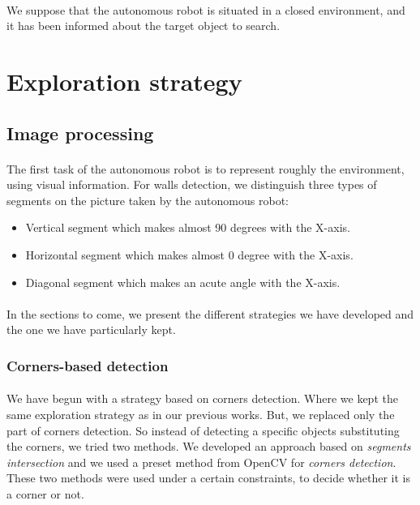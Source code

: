 \documentclass[12pt]{report}
\begin{document}
    \paragraph{}
    We suppose that the autonomous robot is situated in a closed environment, and it has been informed about the target object to search. 
	\section{Exploration strategy}
	 \subsection{Image processing}
	 \paragraph{}
	 The first task of the autonomous robot is to represent roughly the environment, using visual information. For walls detection, we distinguish three types of segments on the picture taken by the autonomous robot:
	 \begin{itemize}
	 	\item Vertical segment which makes almost 90 degrees with the X-axis.
	 	\item Horizontal segment which makes almost 0 degree with the  X-axis.
	 	\item Diagonal segment which makes an acute angle with the X-axis.
	 \end{itemize} 
	 
	 
	 \paragraph{}
	 In the sections to come, we present the different strategies we have developed and the one we have particularly kept.
	 
	 \subsubsection{Corners-based detection}
	 \paragraph{}
	 We have begun with a strategy based on corners detection. Where we kept the same exploration strategy as in our previous works. But, we replaced only the part of corners detection. So instead of detecting a specific objects substituting the corners, we tried two methods. We developed an approach based on \textit{segments intersection} and we used a preset method from OpenCV for \textit{corners detection}. These two methods were used under a certain constraints, to decide whether it is a corner or not.
\end{document}
